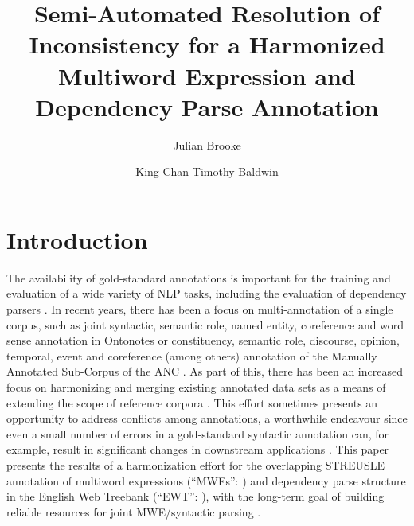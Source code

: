 \documentclass[output=paper
,modfonts
,nonflat]{langsci/langscibook}
\title{Semi-Automated Resolution of Inconsistency for a Harmonized Multiword Expression and Dependency Parse Annotation}
\author{%
 Julian Brooke\affiliation{The University of Melbourne}\and 
 King Chan\affiliation{The University of Melbourne}\lastand 
 Timothy Baldwin \affiliation{The University of Melbourne}
}
\begin{document}
\maketitle

\section{Introduction}

The availability of gold-standard annotations is important for the training and evaluation of a wide variety of NLP tasks, including the evaluation of dependency parsers \citep{Buchholz:2006:CST:1596276.1596305}. In recent years, there has been a focus on multi-annotation of a single corpus, such as joint syntactic, semantic role, named entity, coreference and word sense annotation in Ontonotes \citep{Hovy+:2006} or constituency, semantic role, discourse, opinion, temporal, event and coreference (among others) annotation of the Manually Annotated Sub-Corpus of the ANC \citep{Ide+:2010}. As part of this, there has been an increased focus on harmonizing and merging existing annotated data sets as a means of extending the scope of reference corpora \citep{Ide:2007:GGF:1642059.1642060,Declerk08,SimiMB15}.  This effort sometimes presents an opportunity to address conflicts among annotations, a worthwhile endeavour since even a small number of errors in a gold-standard syntactic annotation can, for example, result in significant changes in downstream applications \citep{habash2007determining}. This paper presents the results of a harmonization effort for the overlapping STREUSLE annotation \citep{Schneider14} of multiword expressions (``MWEs'': \citet{Baldwin10}) and dependency parse structure in the English Web Treebank (``EWT'': \citet{EWT}), with the long-term goal of building reliable resources for joint MWE/syntactic parsing \citep{Constant16}.
\end{document}
